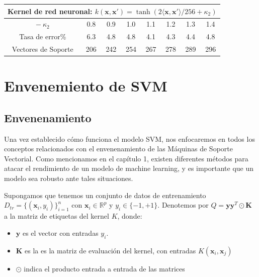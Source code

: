 \documentclass[letterpaper,12pt,oneside]{book}
\begin{document}
{{{{%
\begin{table}[h]
    \centering
    \renewcommand{\arraystretch}{1.2}
    \setlength{\tabcolsep}{10pt}
    \begin{tabular}{c|ccccccc}
        \multicolumn{8}{c}{\textbf{Kernel de red neuronal:} \( k(\mathbf{x}, \mathbf{x}') = \tanh \left( 2 \langle \mathbf{x}, \mathbf{x}' \rangle/ 256 + \kappa_2 \right) \)} \\ \hline
        \(-\ \kappa_2\) & 0.8 & 0.9 & 1.0 & 1.1 & 1.2 & 1.3 & 1.4 \\ \hline
        Tasa de error\% & 6.3 & 4.8 & 4.8 & 4.1 & 4.3 & 4.4 & 4.8 \\
        Vectores de Soporte & 206 & 242 & 254 & 267 & 278 & 289 & 296 \\
    \end{tabular}
\end{table}



       
       
       
       
       
       
       
    
\chapter{Envenemiento de SVM}

\section{Envenenamiento}
Una vez establecido cómo funciona el modelo SVM, nos enfocaremos en todos los conceptos relacionados con el envenenamiento de las Máquinas de Soporte Vectorial. Como mencionamos en el capítulo 1, existen diferentes métodos para atacar el rendimiento de un modelo de machine learning, y es importante que un modelo sea robusto ante tales situaciones.

Supongamos que tenemos un conjunto de datos de entrenamiento $D_{tr}=\{ (\mathbf{x}_i, y_i) \}_{i=1}^{n}$ con  $\mathbf{x}_i \in \mathbb{R}^p$ y $y_i \in \{-1,+1\}$.
Denotemos por $Q = \mathbf{y}\mathbf{y}^{T} \odot \textbf{K}$ a la matriz de etiquetas del kernel \(K\), donde:
\begin{itemize}
        \item $\mathbf{y}$ es el vector con entradas $y_i$.
        \item \(\textbf{K}\) es la es la matriz de evaluación del kernel, con entradas 				$K(\mathbf{x}_i, \mathbf{x}_j)$
        \item $\odot$ indica el producto entrada a entrada de las matrices
\end{itemize} 

}}}}
\end{document}
